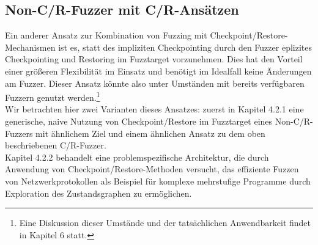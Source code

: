 \documentclass[a4paper]{article}
\begin{document}
\subsection{Non-C/R-Fuzzer mit C/R-Ansätzen}
Ein anderer Ansatz zur Kombination von Fuzzing mit Checkpoint/Restore-Mechanismen ist es, statt des impliziten Checkpointing durch den Fuzzer eplizites Checkpointing und Restoring im Fuzztarget vorzunehmen.
Dies hat den Vorteil einer größeren Flexibilität im Einsatz und benötigt im Idealfall keine Änderungen am Fuzzer. Dieser Ansatz könnte also unter Umständen mit bereits verfügbaren Fuzzern genutzt werden.\footnote{Eine Diskussion dieser Umstände und der tatsächlichen Anwendbarkeit findet in Kapitel 6 statt.}\\
Wir betrachten hier zwei Varianten dieses Ansatzes: zuerst in Kapitel 4.2.1 eine generische, naive Nutzung von Checkpoint/Restore im Fuzztarget eines Non-C/R-Fuzzers mit ähnlichem Ziel und einem ähnlichen Ansatz zu dem oben beschriebenen C/R-Fuzzer.\\
Kapitel 4.2.2 behandelt eine problemspezifische Architektur, die durch Anwendung von Checkpoint/Restore-Methoden versucht, das effiziente Fuzzen von Netzwerkprotokollen als Beispiel für komplexe mehrstufige Programme durch Exploration des Zustandsgraphen zu ermöglichen.
\end{document}
